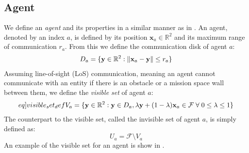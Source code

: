 \subsection{Agent}
We define an \textit{agent} and its properties in a similar manner as in \cite{sun2014escaping}.
An agent, denoted by an index $a$, is defined by its position $\mathbf{x}_{a}\in\mathbb{R}^{2}$ and 
its maximum range of communication $r_{a}$. From this we define the communication disk of agent $a$:
\begin{equation}
  D_{a} = \{\mathbf{y}\in\mathbb{R}^{2}: \left\lVert\mathbf{x}_{a} - \mathbf{y}\right\rVert\leq r_{a}\}
\end{equation}
Assuming line-of-sight (LoS) communication, meaning an agent cannot communicate with an entity if there is an obstacle or a mission space wall between them, we define the \textit{visible set} of agent 
$a$:
\begin{equation}\label[eq]{visible_set_def}
  V_{a} = \{\mathbf{y}\in\mathbb{R}^{2}:\mathbf{y}\in D_{a}, \lambda\mathbf{y} + (1-\lambda)\mathbf{x}_{a}\in\mathcal{F}\;\forall\;0\leq\lambda\leq 1\}
\end{equation}
The counterpart to the visible set, called the invisible set of agent $a$, is simply defined as:
\begin{equation}
  U_{a} = \mathcal{F}\setminus V_{a}
\end{equation}
An example of the visible set for an agent is show in .

